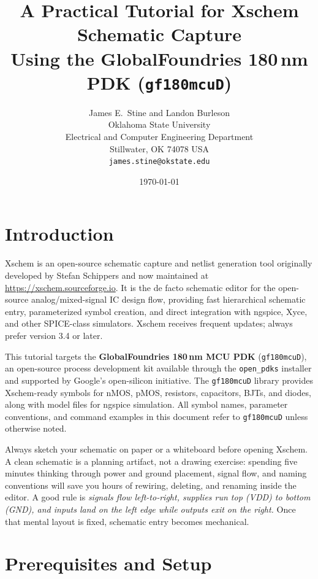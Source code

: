 \documentclass[11pt]{article}
\title{A Practical Tutorial for Xschem Schematic Capture\\[4pt]
       \large Using the GlobalFoundries 180\,nm PDK (\texttt{gf180mcuD})}
\author{James E.\ Stine and Landon Burleson\\
        Oklahoma State University\\
        Electrical and Computer Engineering Department\\
        Stillwater, OK 74078 USA\\
        \texttt{james.stine@okstate.edu}}
\date{\today}
\begin{document}
\maketitle
\tableofcontents
\newpage

\section{Introduction}

Xschem is an open-source schematic capture and netlist generation tool
originally developed by Stefan Schippers and now maintained at
\url{https://xschem.sourceforge.io}.
It is the de facto schematic editor for the open-source analog/mixed-signal
IC design flow, providing fast hierarchical schematic entry, parameterized
symbol creation, and direct integration with ngspice, Xyce, and other
SPICE-class simulators.
Xschem receives frequent updates; always prefer version 3.4 or later.

This tutorial targets the \textbf{GlobalFoundries 180\,nm MCU PDK}
(\texttt{gf180mcuD}), an open-source process development kit available
through the \texttt{open\_pdks} installer and supported by Google's
open-silicon initiative.
The \texttt{gf180mcuD} library provides Xschem-ready symbols for nMOS,
pMOS, resistors, capacitors, BJTs, and diodes, along with model files for
ngspice simulation.
All symbol names, parameter conventions, and command examples in this
document refer to \texttt{gf180mcuD} unless otherwise noted.

\begin{tipbox}
Always sketch your schematic on paper or a whiteboard before opening
Xschem.
A clean schematic is a planning artifact, not a drawing exercise:
spending five minutes thinking through power and ground placement,
signal flow, and naming conventions will save you hours of rewiring,
deleting, and renaming inside the editor.
A good rule is \emph{signals flow left-to-right, supplies run top
(VDD) to bottom (GND), and inputs land on the left edge while outputs
exit on the right.}
Once that mental layout is fixed, schematic entry becomes mechanical.
\end{tipbox}

\section{Prerequisites and Setup}
\end{document}

